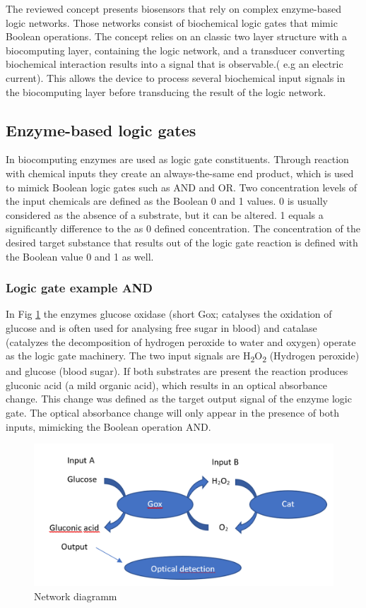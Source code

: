\documentclass[runningheads]{llncs}
\begin{document}
The reviewed concept presents biosensors that rely on complex enzyme-based logic networks. Those networks consist of biochemical logic gates that mimic Boolean operations. The concept relies on an classic two layer structure with a biocomputing layer, containing the logic network, and a transducer converting biochemical interaction results into a signal that is observable.( e.g an electric current). This allows the device to process several biochemical input signals in the biocomputing layer before transducing the result of the logic network.


\subsection{Enzyme-based logic gates}		
		In biocomputing enzymes are used as logic gate constituents. Through reaction with chemical inputs they create an always-the-same end product, which is used to mimick Boolean logic gates such as AND and OR. Two concentration levels of the input chemicals are defined as the Boolean 0 and 1 values. 0 is usually considered as the absence of a substrate, but it can be altered. 1 equals a significantly difference to the as 0 defined concentration. 
		The concentration of the desired target substance that results out of the logic gate reaction is defined with the Boolean value 0 and 1 as well. \cite{source3}\\
	
		\subsubsection{Logic gate example AND}
		In Fig \ref{img:and} the enzymes glucose oxidase (short Gox; catalyses the oxidation of glucose and is often used for analysing free sugar in blood) and catalase (catalyzes the decomposition of hydrogen peroxide to water and oxygen) operate as the logic gate machinery. The two input signals are H\textsubscript{2}O\textsubscript{2} (Hydrogen peroxide) and glucose (blood sugar). If both substrates are present the reaction produces gluconic acid (a mild organic acid), which results in an optical absorbance change. This change was defined as the target output signal of the enzyme logic gate. The optical absorbance change will only appear in the presence of both inputs, mimicking the Boolean operation AND. 
		
		\begin{figure}[H] \centering \includegraphics[scale= 0.3]{pics/ANDneu.png} \caption{Network diagramm} \label{img:and} \end{figure}
		
\end{document}

